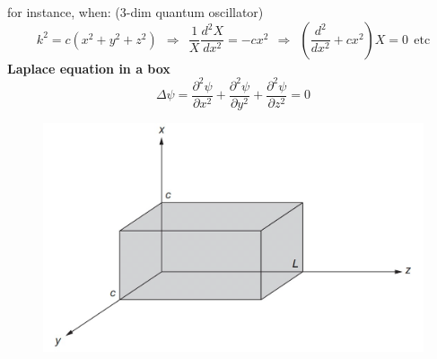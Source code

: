 \documentclass{article}
\begin{document}
\newpage

\noindent
for instance, when: (3-dim quantum oscillator)
\begin{equation}
    k^2 = c(x^2 + y^2 + z^2) 
     \ \ \Rightarrow \ \ \frac{1}{X} \frac{d^2 X}{dx^2} = -cx^2 \ \ \Rightarrow \ \ \left( \frac{d^2}{dx^2} + cx^2 \right)X = 0 \ \ \text{etc}
\end{equation}
\textbf{Laplace equation in a box}
\begin{equation}
    \Delta \psi = \frac{\partial^2 \psi}{\partial x^2}
+ \frac{\partial^2 \psi}{\partial y^2}
+ \frac{\partial^2 \psi}{\partial z^2} = 0
\end{equation}

\begin{figure}[h]
    \centering
    \includegraphics[width=0.6\linewidth]{fig61.png}
\end{figure}
\end{document}
